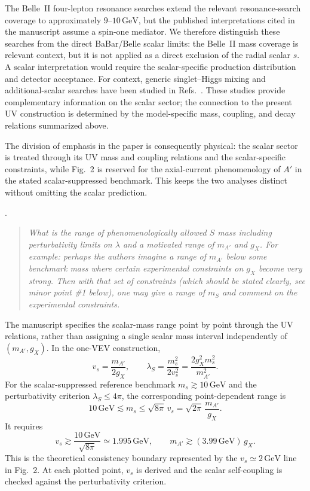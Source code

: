 \documentclass[12pt,a4paper]{article}
\begin{document}
The Belle~II four-lepton resonance searches extend the relevant resonance-search coverage to approximately \(9\text{--}10\,\mathrm{GeV}\), but the published interpretations cited in the manuscript assume a spin-one mediator. We therefore distinguish these searches from the direct BaBar/Belle scalar limits: the Belle~II mass coverage is relevant context, but it is not applied as a direct exclusion of the radial scalar \(s\). A scalar interpretation would require the scalar-specific production distribution and detector acceptance. For context, generic singlet--Higgs mixing and additional-scalar searches have been studied in Refs.~\cite{Robens:2015singlet,Robens:2020twoSinglets,Boiarska:2019scalarPortal}. These studies provide complementary information on the scalar sector; the connection to the present UV construction is determined by the model-specific mass, coupling, and decay relations summarized above.

The division of emphasis in the paper is consequently physical: the scalar sector is treated through its UV mass and coupling relations and the scalar-specific constraints, while Fig.~2 is reserved for the axial-current phenomenology of \(A'\) in the stated scalar-suppressed benchmark. This keeps the two analyses distinct without omitting the scalar prediction.

\medskip
{}. \begin{quote}\itshape
What is the range of phenomenologically allowed \(S\) mass including perturbativity limits on \(\lambda\) and a motivated range of \(m_{A'}\) and \(g_X\). For example: perhaps the authors imagine a range of \(m_{A'}\) below some benchmark mass where certain experimental constraints on \(g_X\) become very strong. Then with that set of constraints (which should be stated clearly, see minor point \#1 below), one may give a range of \(m_S\) and comment on the experimental constraints.\end{quote}

The manuscript specifies the scalar-mass range point by point through the UV relations, rather than assigning a single scalar mass interval independently of \((m_{A'},g_X)\). In the one-VEV construction,
\[
v_s=\frac{m_{A'}}{2g_X},
\qquad
\lambda_S=\frac{m_s^2}{2v_s^2}
=\frac{2g_X^2m_s^2}{m_{A'}^2}.
\]
For the scalar-suppressed reference benchmark \(m_s\gtrsim10\,\mathrm{GeV}\) and the perturbativity criterion \(\lambda_S\leq4\pi\), the corresponding point-dependent range is
\[
10\,\mathrm{GeV}\lesssim m_s\leq\sqrt{8\pi}\,v_s
=\sqrt{2\pi}\,\frac{m_{A'}}{g_X}.
\]
It requires
\[
v_s\gtrsim\frac{10\,\mathrm{GeV}}{\sqrt{8\pi}}
\simeq1.995\,\mathrm{GeV},
\qquad
m_{A'}\gtrsim(3.99\,\mathrm{GeV})\,g_X.
\]
This is the theoretical consistency boundary represented by the \(v_s\simeq2\,\mathrm{GeV}\) line in Fig.~2. At each plotted point, \(v_s\) is derived and the scalar self-coupling is checked against the perturbativity criterion.
\end{document}
